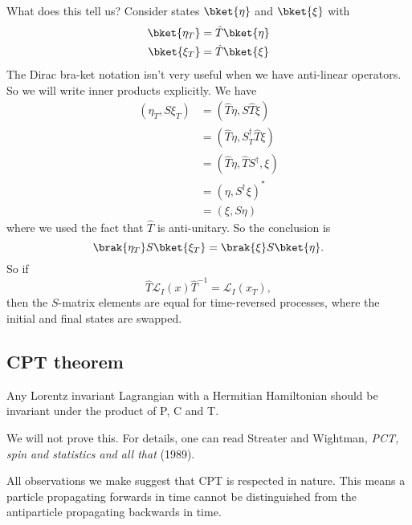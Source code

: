 \documentclass[a4paper]{article}
\begin{document}
\begin{eg}
  What does this tell us? Consider states $\bket{\eta}$ and $\bket{\xi}$ with
  \begin{align*}
    \bket{\eta_T} &= \hat{T} \bket{\eta}\\
    \bket{\xi_T} &= \hat{T} \bket{\xi}
  \end{align*}
  The Dirac bra-ket notation isn't very useful when we have anti-linear operators. So we will write inner products explicitly. We have
  \begin{align*}
    (\eta_T, S\xi_T) &= (\hat{T} \eta, S\hat{T} \xi) \\
    &= (\hat{T} \eta, S_T^\dagger \hat{T} \xi) \\
    &= (\hat{T} \eta, \hat{T} S^\dagger, \xi) \\
    &= (\eta, S^\dagger \xi)^* \\
    &= (\xi, S\eta)
  \end{align*}
  where we used the fact that $\hat{T}$ is anti-unitary. So the conclusion is
  \[
    \brak{\eta_T} S\bket{\xi_T} = \brak{\xi}S\bket{\eta}.
  \]
  So if
  \[
    \hat{T} \mathcal{L}_I(x) \hat{T}^{-1} = \mathcal{L}_I(x_T),
  \]
  then the $S$-matrix elements are equal for time-reversed processes, where the initial and final states are swapped.
\end{eg}

\subsection{CPT theorem}
\begin{thm}
  Any Lorentz invariant Lagrangian with a Hermitian Hamiltonian should be invariant under the product of P, C and T.
\end{thm}
We will not prove this. For details, one can read Streater and Wightman, \emph{PCT, spin and statistics and all that} (1989).

All observations we make suggest that CPT is respected in nature. This means a particle propagating forwards in time cannot be distinguished from the antiparticle propagating backwards in time.
\end{document}
